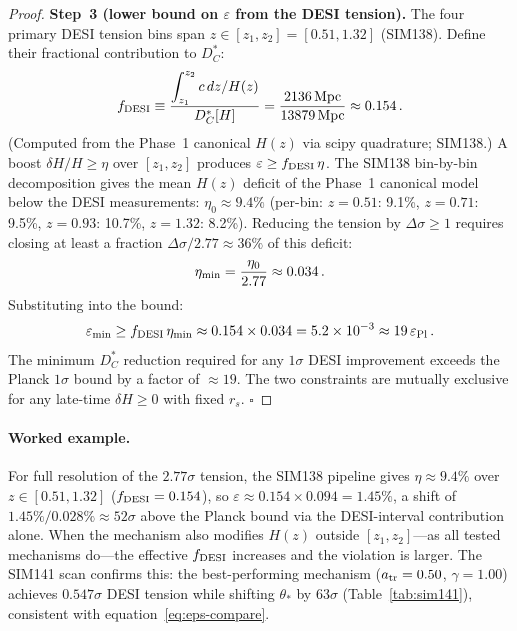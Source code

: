 \documentclass[12pt,a4paper]{article}
\newcommand{\thetastar}{\theta_*}
\newcommand{\rs}{r_s}
\newcommand{\DC}{D_C^*}
\theoremstyle{plain}
\begin{document}
\begin{proof}
\textbf{Step~3 (lower bound on $\varepsilon$ from the DESI tension).}
The four primary DESI tension bins span $z\in[z_1,z_2]=[0.51,1.32]$
(SIM138). Define their fractional contribution to $\DC$:
\begin{equation}
  f_{\rm DESI}
  \equiv \frac{\displaystyle\int_{z_1}^{z_2} c\,dz/H(z)}{\DC[H]}
  = \frac{2136\,\mathrm{Mpc}}{13879\,\mathrm{Mpc}}
  \approx 0.154\,.
  \label{eq:f-desi}
\end{equation}
(Computed from the Phase~1 canonical $H(z)$ via scipy quadrature; SIM138.)
A boost $\delta H/H \geq \eta$ over $[z_1,z_2]$ produces
$\varepsilon \geq f_{\rm DESI}\,\eta$.
The SIM138 bin-by-bin decomposition gives the mean $H(z)$ deficit of the
Phase~1 canonical model below the DESI measurements:
$\eta_0 \approx 9.4\%$ (per-bin: $z=0.51$: 9.1\%, $z=0.71$: 9.5\%,
$z=0.93$: 10.7\%, $z=1.32$: 8.2\%). Reducing the tension by
$\Delta\sigma \geq 1$ requires closing at least a fraction
$\Delta\sigma/2.77 \approx 36\%$ of this deficit:
\begin{equation}
  \eta_{\rm min}
  = \frac{\eta_0}{2.77}
  \approx 0.034\,.
\end{equation}
Substituting into the bound:
\begin{equation}
  \varepsilon_{\rm min}
  \geq f_{\rm DESI}\,\eta_{\rm min}
  \approx 0.154 \times 0.034
  = 5.2\times10^{-3}
  \approx 19\,\varepsilon_{\rm Pl}\,.
  \label{eq:eps-compare}
\end{equation}
The minimum $\DC$ reduction required for any $1\sigma$ DESI improvement
exceeds the Planck $1\sigma$ bound by a factor of $\approx 19$.
The two constraints are mutually exclusive for any late-time $\delta H \geq 0$
with fixed $\rs$. $\square$
\end{proof}

\paragraph{Worked example.}
For full resolution of the $2.77\sigma$ tension, the SIM138 pipeline gives
$\eta \approx 9.4\%$ over $z\in[0.51,1.32]$ ($f_{\rm DESI}=0.154$), so
$\varepsilon \approx 0.154 \times 0.094 = 1.45\%$, a shift of
$1.45\%/0.028\% \approx 52\sigma$ above the Planck bound via the
DESI-interval contribution alone. When the mechanism also modifies $H(z)$
outside $[z_1,z_2]$---as all tested mechanisms do---the effective
$f_{\rm DESI}$ increases and the violation is larger. The SIM141 scan
confirms this: the best-performing mechanism ($a_{\rm tr}=0.50$,
$\gamma=1.00$) achieves $0.547\sigma$ DESI tension while shifting
$\thetastar$ by $63\sigma$ (Table~\ref{tab:sim141}), consistent with
equation~\eqref{eq:eps-compare}.
\end{document}
